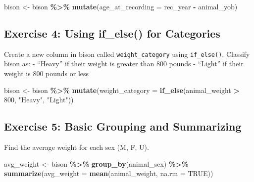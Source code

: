 \documentclass[
]{article}
\newenvironment{Shaded}{\begin{snugshade}}{\end{snugshade}}
\newcommand{\AttributeTok}[1]{\textcolor[rgb]{0.13,0.29,0.53}{#1}}
\newcommand{\ConstantTok}[1]{\textcolor[rgb]{0.56,0.35,0.01}{#1}}
\newcommand{\DecValTok}[1]{\textcolor[rgb]{0.00,0.00,0.81}{#1}}
\newcommand{\FunctionTok}[1]{\textcolor[rgb]{0.13,0.29,0.53}{\textbf{#1}}}
\newcommand{\NormalTok}[1]{#1}
\newcommand{\OtherTok}[1]{\textcolor[rgb]{0.56,0.35,0.01}{#1}}
\newcommand{\SpecialCharTok}[1]{\textcolor[rgb]{0.81,0.36,0.00}{\textbf{#1}}}
\newcommand{\StringTok}[1]{\textcolor[rgb]{0.31,0.60,0.02}{#1}}
\begin{document}
\begin{Shaded}
\begin{Highlighting}[]
\NormalTok{bison }\OtherTok{\textless{}{-}}\NormalTok{ bison }\SpecialCharTok{\%\textgreater{}\%}
  \FunctionTok{mutate}\NormalTok{(}\AttributeTok{age\_at\_recording =}\NormalTok{ rec\_year }\SpecialCharTok{{-}}\NormalTok{ animal\_yob)}
\end{Highlighting}
\end{Shaded}

\subsection{Exercise 4: Using if\_else() for
Categories}\label{exercise-4-using-if_else-for-categories}

Create a new column in bison called \texttt{weight\_category} using
\texttt{if\_else()}. Classify bison as: - ``Heavy'' if their weight is
greater than 800 pounds - ``Light'' if their weight is 800 pounds or
less

\begin{Shaded}
\begin{Highlighting}[]
\NormalTok{bison }\OtherTok{\textless{}{-}}\NormalTok{ bison }\SpecialCharTok{\%\textgreater{}\%}
  \FunctionTok{mutate}\NormalTok{(}\AttributeTok{weight\_category =} \FunctionTok{if\_else}\NormalTok{(animal\_weight }\SpecialCharTok{\textgreater{}} \DecValTok{800}\NormalTok{, }\StringTok{"Heavy"}\NormalTok{, }\StringTok{"Light"}\NormalTok{))}
\end{Highlighting}
\end{Shaded}

\subsection{Exercise 5: Basic Grouping and
Summarizing}\label{exercise-5-basic-grouping-and-summarizing}

Find the average weight for each sex (M, F, U).

\begin{Shaded}
\begin{Highlighting}[]
\NormalTok{avg\_weight }\OtherTok{\textless{}{-}}\NormalTok{ bison }\SpecialCharTok{\%\textgreater{}\%}
  \FunctionTok{group\_by}\NormalTok{(animal\_sex) }\SpecialCharTok{\%\textgreater{}\%}
  \FunctionTok{summarize}\NormalTok{(}\AttributeTok{avg\_weight =} \FunctionTok{mean}\NormalTok{(animal\_weight, }\AttributeTok{na.rm =} \ConstantTok{TRUE}\NormalTok{))}
\end{Highlighting}
\end{Shaded}
\end{document}
